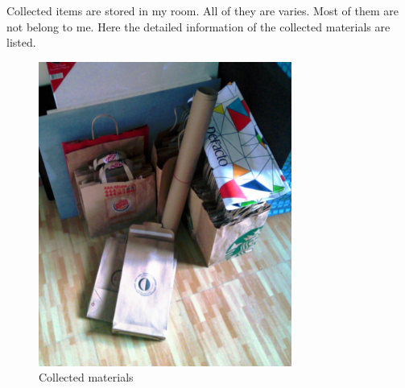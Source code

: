 Collected items are stored in my room. All of they are varies. Most of them are not belong to me. Here the detailed information of the collected materials are listed.

\begin{figure}[h!]
  \centering
  \includegraphics[height=10cm]{project_graphics/collected_all_together.jpg}
  \caption{Collected materials}
  \label{fig:CollectedAllTogether}
\end{figure}








